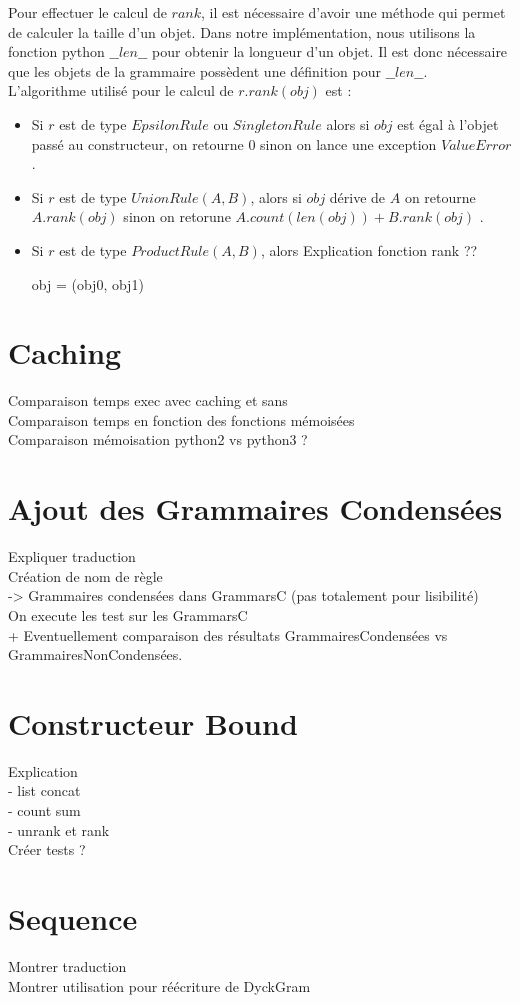 \documentclass[a4paper, titlepage]{article}
\begin{document}
Pour effectuer le calcul de $rank$, il est nécessaire d'avoir une
méthode qui permet de calculer la taille d'un objet. Dans notre
implémentation, nous utilisons la fonction python $\_\_len\_\_$ pour
obtenir la longueur d'un objet. Il est donc nécessaire que les objets
de la grammaire possèdent une définition pour $\_\_len\_\_$.\\

L'algorithme utilisé pour le calcul de $r.rank(obj)$ est :\\

\begin{itemize}
  
\item Si $r$ est de type $EpsilonRule$ ou $SingletonRule$ alors si
  $obj$ est égal à l'objet passé au constructeur, on retourne 0 sinon on
  lance une exception $ValueError$.\\

\item Si $r$ est de type $UnionRule(A, B)$, alors si $obj$ dérive de
  $A$ on retourne $A.rank(obj)$ sinon on retorune $A.count(len(obj)) +
  B.rank(obj)$ .\\

\item Si $r$ est de type $ProductRule(A, B)$, alors
  Explication fonction rank ??
  
obj = (obj0, obj1) 
\end{itemize}



\section{Caching}
Comparaison temps exec avec caching et sans\\
Comparaison temps en fonction des fonctions mémoisées\\
Comparaison mémoisation python2 vs python3 ?\\

\section{Ajout des Grammaires Condensées}
Expliquer traduction\\
Création de nom de règle\\
-> Grammaires condensées dans GrammarsC (pas totalement pour
lisibilité)\\
On execute les test sur les GrammarsC\\
+ Eventuellement comparaison des résultats GrammairesCondensées vs
GrammairesNonCondensées.\\

\section{Constructeur Bound}
Explication\\
- list concat\\
- count sum\\
- unrank et rank\\
Créer tests ?\\

\section {Sequence}
Montrer traduction\\ 
Montrer utilisation pour réécriture de DyckGram\\
\end{document}
